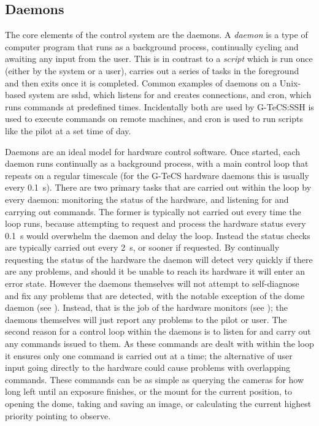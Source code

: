 
\subsection{Daemons}
\label{sec:daemons}
\begin{colsection}

The core elements of the control system are the daemons. A \emph{daemon} is a type of computer program that runs as a background process, continually cycling and awaiting any input from the user. This is in contrast to a \emph{script} which is run once (either by the system or a user), carries out a series of tasks in the foreground and then exits once it is completed. Common examples of daemons on a Unix-based system are sshd, which listens for and creates  connections, and cron, which runs commands at predefined times. Incidentally both are used by G-TeCS:\@ SSH is used to execute commands on remote machines, and cron is used to run scripts like the pilot at a set time of day.

Daemons are an ideal model for hardware control software. Once started, each daemon runs continually as a background process, with a main control loop that repeats on a regular timescale (for the G-TeCS hardware daemons this is usually every \SI{0.1}{\second}). There are two primary tasks that are carried out within the loop by every daemon: monitoring the status of the hardware, and listening for and carrying out commands. The former is typically not carried out every time the loop runs, because attempting to request and process the hardware status every \SI{0.1}{\second} would overwhelm the daemon and delay the loop. Instead the status checks are typically carried out every \SI{2}{\second}, or sooner if requested. By continually requesting the status of the hardware the daemon will detect very quickly if there are any problems, and should it be unable to reach its hardware it will enter an error state. However the daemons themselves will not attempt to self-diagnose and fix any problems that are detected, with the notable exception of the dome daemon (see ). Instead, that is the job of the hardware monitors (see ); the daemons themselves will just report any problems to the pilot or user. The second reason for a control loop within the daemons is to listen for and carry out any commands issued to them. As these commands are dealt with within the loop it ensures only one command is carried out at a time; the alternative of user input going directly to the hardware could cause problems with overlapping commands. These commands can be as simple as querying the cameras for how long left until an exposure finishes, or the mount for the current position, to opening the dome, taking and saving an image, or calculating the current highest priority pointing to observe.


\end{colsection}
